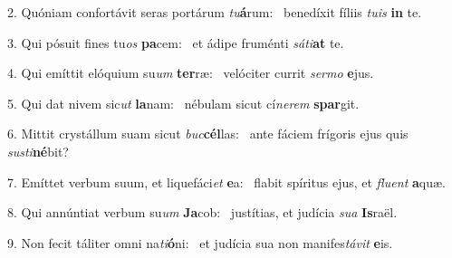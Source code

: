 2. Quóniam confortávit seras portárum \textit{tu}\textbf{á}rum: \ast\  benedíxit fíliis \textit{tu}\textit{is} \textbf{in} te.\

3. Qui pósuit fines tu\textit{os} \textbf{pa}cem: \ast\  et ádipe fruménti \textit{sá}\textit{ti}\textbf{at} te.\

4. Qui emíttit elóquium su\textit{um} \textbf{ter}ræ: \ast\  velóciter currit \textit{ser}\textit{mo} \textbf{e}jus.\

5. Qui dat nivem sic\textit{ut} \textbf{la}nam: \ast\  nébulam sicut cí\textit{ne}\textit{rem} \textbf{spar}git.\

6. Mittit crystállum suam sicut \textit{buc}\textbf{cél}las: \ast\  ante fáciem frígoris ejus quis \textit{sus}\textit{ti}\textbf{né}bit?\

7. Emíttet verbum suum, et liquefáci\textit{et} \textbf{e}a: \ast\  flabit spíritus ejus, et \textit{flu}\textit{ent} \textbf{a}quæ.\

8. Qui annúntiat verbum su\textit{um} \textbf{Ja}cob: \ast\  justítias, et judícia \textit{su}\textit{a} \textbf{Is}raël.\

9. Non fecit táliter omni na\textit{ti}\textbf{ó}ni: \ast\  et judícia sua non manifes\textit{tá}\textit{vit} \textbf{e}is.\

